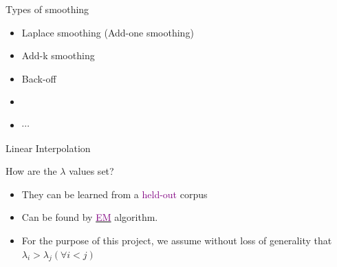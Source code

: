 \documentclass{beamer}
\begin{document}
\begin{frame}{Types of smoothing}
    \begin{itemize}
        \item Laplace smoothing (Add-one smoothing)
        \item Add-k smoothing
        \item Back-off
        \item {}
        \item $\cdots$
    \end{itemize}
\end{frame}

\begin{frame}{Linear Interpolation}




\end{frame}

\begin{frame}{How are the $\lambda$ values set?}
    \begin{itemize}
        \item They can be learned from a \textcolor{purple}{held-out} corpus
        \item Can be found by \href{https://www.cs.cmu.edu/~roni/11761/Presentations/degenerateEM.pdf}{\textcolor{purple}{EM}} algorithm.
        \item For the purpose of this project, we assume without loss of generality that $\lambda_i > \lambda_j (\forall i < j)$
    \end{itemize}
\end{frame}
\end{document}
